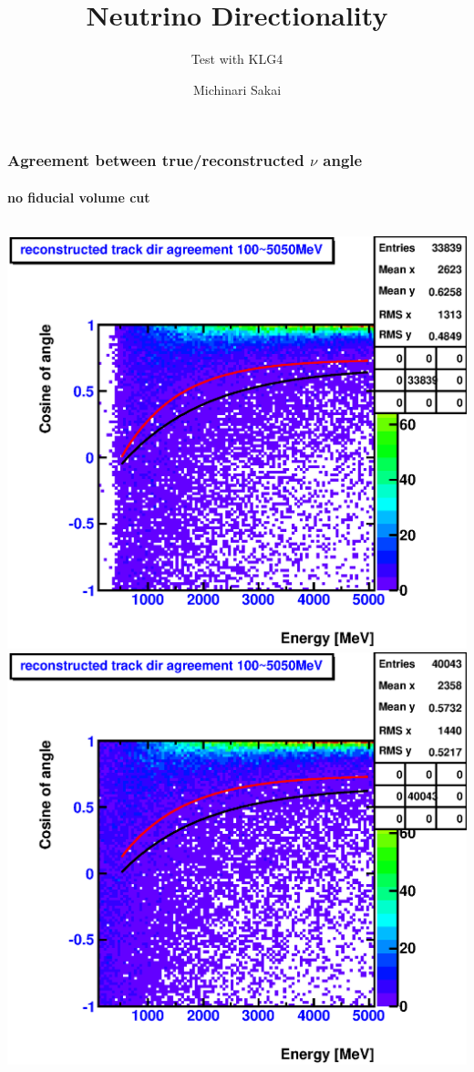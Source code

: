 \documentclass{beamer}
\title{Neutrino Directionality}
\subtitle{Test with KLG4}
\author[Michinari]{Michinari Sakai}
\begin{document}
\frame{\titlepage}

\begin{frame}
	\frametitle{Agreement between true/reconstructed $\nu$ angle}
	\framesubtitle{no fiducial volume cut}
	\begin{columns}[T]
		\includegraphics[width=1.0\textwidth]{analyzed_mtq_flatSpectrum_nue_H1_outerBufferFillAll_reconDirAgreementWithMtqTruthVectorVSEnergy_onlyCC.eps}
		\includegraphics[width=1.0\textwidth]{analyzed_mtq_flatSpectrum_nue_C12_outerBufferFillAll_reconDirAgreementWithMtqTruthVectorVSEnergy_onlyCC.eps}
	\end{columns}
\end{frame}
\end{document}
